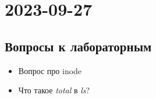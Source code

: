 \section{2023-09-27}


\subsection{Вопросы к лабораторным}
\begin{itemize}
	\item Вопрос про inode
	\item Что такое \textit{total} в \textit{ls}? 
		
\end{itemize}
